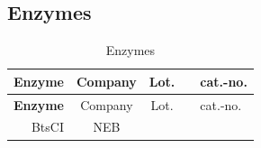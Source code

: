 \documentclass[11pt,singlespacinge,twoside]{reedthesis} %
\begin{document}
\hypertarget{mat-enz}{%
\subsection{Enzymes}\label{mat-enz}}
\begin{longtable}[]{@{}rccll@{}}
\caption{\label{tab:mat-enz} Enzymes}\tabularnewline
\toprule
\begin{minipage}[b]{0.24\columnwidth}\raggedleft
\textbf{Enzyme}\strut
\end{minipage} & \begin{minipage}[b]{0.16\columnwidth}\centering
Company\strut
\end{minipage} & \begin{minipage}[b]{0.12\columnwidth}\centering
Lot.\strut
\end{minipage} & \begin{minipage}[b]{0.24\columnwidth}\raggedright
\strut
\end{minipage} & \begin{minipage}[b]{0.11\columnwidth}\raggedright
cat.-no.\strut
\end{minipage}\tabularnewline
\midrule
\endfirsthead
\toprule
\begin{minipage}[b]{0.24\columnwidth}\raggedleft
\textbf{Enzyme}\strut
\end{minipage} & \begin{minipage}[b]{0.16\columnwidth}\centering
Company\strut
\end{minipage} & \begin{minipage}[b]{0.12\columnwidth}\centering
Lot.\strut
\end{minipage} & \begin{minipage}[b]{0.24\columnwidth}\raggedright
\strut
\end{minipage} & \begin{minipage}[b]{0.11\columnwidth}\raggedright
cat.-no.\strut
\end{minipage}\tabularnewline
\midrule
\endhead
\begin{minipage}[t]{0.24\columnwidth}\raggedleft
BtsCI\strut
\end{minipage} & \begin{minipage}[t]{0.16\columnwidth}\centering
NEB\strut
\end{minipage} & \begin{minipage}[t]{0.12\columnwidth}\centering
\strut
\end{minipage} & \begin{minipage}[t]{0.24\columnwidth}\raggedright
\strut
\end{minipage} & \begin{minipage}[t]{0.11\columnwidth}\raggedright

\end{minipage}
\end{longtable}
\end{document}
